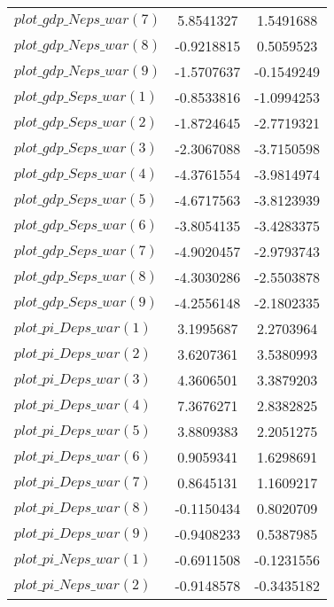 \begin{center}
\begin{longtable}{lcc}
$plot\_gdp\_N eps\_war (7)  $	 & 	      5.8541327	 & 	      1.5491688 \\ 
$plot\_gdp\_N eps\_war (8)  $	 & 	     -0.9218815	 & 	      0.5059523 \\ 
$plot\_gdp\_N eps\_war (9)  $	 & 	     -1.5707637	 & 	     -0.1549249 \\ 
$plot\_gdp\_S eps\_war (1)  $	 & 	     -0.8533816	 & 	     -1.0994253 \\ 
$plot\_gdp\_S eps\_war (2)  $	 & 	     -1.8724645	 & 	     -2.7719321 \\ 
$plot\_gdp\_S eps\_war (3)  $	 & 	     -2.3067088	 & 	     -3.7150598 \\ 
$plot\_gdp\_S eps\_war (4)  $	 & 	     -4.3761554	 & 	     -3.9814974 \\ 
$plot\_gdp\_S eps\_war (5)  $	 & 	     -4.6717563	 & 	     -3.8123939 \\ 
$plot\_gdp\_S eps\_war (6)  $	 & 	     -3.8054135	 & 	     -3.4283375 \\ 
$plot\_gdp\_S eps\_war (7)  $	 & 	     -4.9020457	 & 	     -2.9793743 \\ 
$plot\_gdp\_S eps\_war (8)  $	 & 	     -4.3030286	 & 	     -2.5503878 \\ 
$plot\_gdp\_S eps\_war (9)  $	 & 	     -4.2556148	 & 	     -2.1802335 \\ 
$plot\_pi\_D eps\_war (1)   $	 & 	      3.1995687	 & 	      2.2703964 \\ 
$plot\_pi\_D eps\_war (2)   $	 & 	      3.6207361	 & 	      3.5380993 \\ 
$plot\_pi\_D eps\_war (3)   $	 & 	      4.3606501	 & 	      3.3879203 \\ 
$plot\_pi\_D eps\_war (4)   $	 & 	      7.3676271	 & 	      2.8382825 \\ 
$plot\_pi\_D eps\_war (5)   $	 & 	      3.8809383	 & 	      2.2051275 \\ 
$plot\_pi\_D eps\_war (6)   $	 & 	      0.9059341	 & 	      1.6298691 \\ 
$plot\_pi\_D eps\_war (7)   $	 & 	      0.8645131	 & 	      1.1609217 \\ 
$plot\_pi\_D eps\_war (8)   $	 & 	     -0.1150434	 & 	      0.8020709 \\ 
$plot\_pi\_D eps\_war (9)   $	 & 	     -0.9408233	 & 	      0.5387985 \\ 
$plot\_pi\_N eps\_war (1)   $	 & 	     -0.6911508	 & 	     -0.1231556 \\ 
$plot\_pi\_N eps\_war (2)   $	 & 	     -0.9148578	 & 	     -0.3435182 \\ 

\end{longtable}
\end{center}
